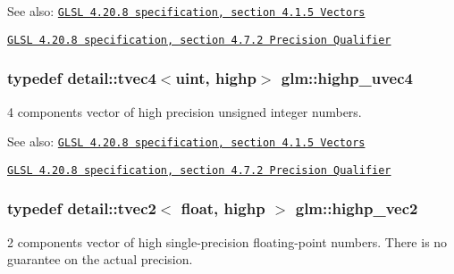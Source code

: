 \begin{Desc}
\item[See also:]\href{http://www.opengl.org/registry/doc/GLSLangSpec.4.20.8.pdf}{\tt GLSL 4.20.8 specification, section 4.1.5 Vectors} 

\href{http://www.opengl.org/registry/doc/GLSLangSpec.4.20.8.pdf}{\tt GLSL 4.20.8 specification, section 4.7.2 Precision Qualifier} \end{Desc}
\hypertarget{group__core__precision_g7cb8cc501f7e680e1889b93eb80e6c46}{
\subsubsection[highp\_\-uvec4]{\setlength{\rightskip}{0pt plus 5cm}typedef detail::tvec4$<$uint, highp$>$ {\bf glm::highp\_\-uvec4}}}
\label{group__core__precision_g7cb8cc501f7e680e1889b93eb80e6c46}


4 components vector of high precision unsigned integer numbers.

\begin{Desc}
\item[See also:]\href{http://www.opengl.org/registry/doc/GLSLangSpec.4.20.8.pdf}{\tt GLSL 4.20.8 specification, section 4.1.5 Vectors} 

\href{http://www.opengl.org/registry/doc/GLSLangSpec.4.20.8.pdf}{\tt GLSL 4.20.8 specification, section 4.7.2 Precision Qualifier} \end{Desc}
\hypertarget{group__core__precision_g37645abcfcc1278567e99f1ca492bfbb}{
\subsubsection[highp\_\-vec2]{\setlength{\rightskip}{0pt plus 5cm}typedef detail::tvec2$<$ float, highp $>$ {\bf glm::highp\_\-vec2}}}
\label{group__core__precision_g37645abcfcc1278567e99f1ca492bfbb}


2 components vector of high single-precision floating-point numbers. There is no guarantee on the actual precision.

